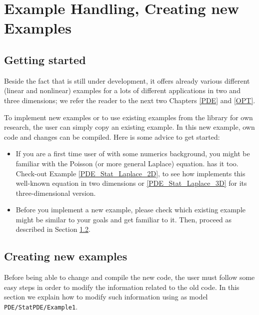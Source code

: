 \chapter{Example Handling, Creating new Examples}
\label{chap:howtoex}
\section{Getting started}
Beside the fact that \dope{} is still under development,
it offers already various different (linear and nonlinear) 
examples for a lots 
of different applications in two and three dimensions; 
we refer the reader to the 
next two Chapters \ref{PDE} and \ref{OPT}. 

To implement new examples or to use existing examples 
from the library for own research, the user 
can simply copy an existing example. In this 
new example, own code and changes can be compiled. Here is some 
advice to get started:
\begin{itemize}
\item If you are a first time user of \dope{} 
with some numerics background, you 
might be familiar with the Poisson (or more general Laplace) equation.
\dope{} has it too. Check-out Example \ref{PDE_Stat_Laplace_2D},
to see how \dope{} implements this well-known equation in two
dimensions or \ref{PDE_Stat_Laplace_3D} for its three-dimensional version.
\item Before you implement a new example, please check which 
existing example might be similar to your goals and get familiar 
to it. Then, proceed as described in Section \ref{getting_started}. 
\end{itemize}


\section{Creating new examples}
\label{getting_started}
Before being able to change and compile the new code, the user must 
follow some easy steps in order to modify the information related to the old code. In 
this section we explain how to modify such information using as model 
\texttt{PDE/StatPDE/Example1}.

